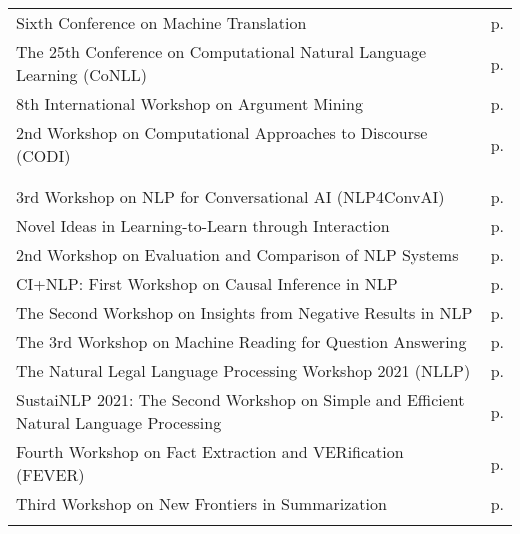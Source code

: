 \begin{center}
\renewcommand{\arraystretch}{1.1}
\vspace{-1em}
\begin{tabular}{@{}%
  >{\raggedright\arraybackslash}p{}
  >{\raggedleft\arraybackslash}p{}}


  \multicolumn{2}{l}{\hspace{-1mm}\large Wednesday--Thursday} \\  \hline
Sixth Conference on Machine Translation & p.\pageref{WShopA} \\
The 25th Conference on Computational Natural Language Learning (CoNLL) & p.\pageref{WShopB} \\
8th International Workshop on Argument Mining & p.\pageref{WShopC} \\
2nd Workshop on Computational Approaches to Discourse (CODI) & p.\pageref{WShopD} \\

  \\

  \multicolumn{2}{l}{\hspace{-1mm}\large Wednesday} \\ \hline
3rd Workshop on NLP for Conversational AI (NLP4ConvAI) & p.\pageref{WShopE} \\
Novel Ideas in Learning-to-Learn through Interaction & p.\pageref{WShopF} \\
2nd Workshop on Evaluation and Comparison of NLP Systems & p.\pageref{WShopG} \\
CI+NLP: First Workshop on Causal Inference in NLP & p.\pageref{WShopH} \\
The Second Workshop on Insights from Negative Results in NLP & p.\pageref{WShopI} \\
The 3rd Workshop on Machine Reading for Question Answering & p.\pageref{WShopJ} \\
The Natural Legal Language Processing Workshop 2021 (NLLP) & p.\pageref{WShopK} \\
SustaiNLP 2021: The Second Workshop on Simple and Efficient Natural Language Processing & p.\pageref{WShopL} \\
Fourth Workshop on Fact Extraction and VERification (FEVER) & p.\pageref{WShopM} \\
Third Workshop on New Frontiers in Summarization & p.\pageref{WShopN} \\
  \\


\end{tabular}
\end{center}
